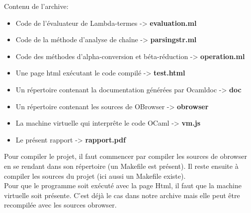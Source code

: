\documentclass[a4paper,11pt,titlepage]{article}
\begin{document}
  Contenu de l'archive:
\begin{itemize}
 \item Code de l'évaluateur de Lambda-termes  -> \textbf{evaluation.ml}
 \item Code de la méthode d'analyse de chaîne -> \textbf{parsingstr.ml}
 \item Code des méthodes d'alpha-conversion et béta-réduction -> \textbf{operation.ml}
 \item Une page html exécutant le code compilé -> \textbf{test.html}
 \item Un répertoire contenant la documentation générées par Ocamldoc -> \textbf{doc}
 \item Un répertoire contenant les sources de OBrowser -> \textbf{obrowser}
 \item La machine virtuelle qui interprête le code OCaml -> \textbf{vm.js}
 \item Le présent rapport -> \textbf{rapport.pdf}\\
\end{itemize}

  Pour compiler le projet, il faut commencer par compiler les sources de obrowser en se rendant dans son répertoire (un Makefile est présent). Il reste ensuite à compiler les sources du projet (ici aussi un Makefile existe).\\

  Pour que le programme soit exécuté avec la page Html, il faut que la machine virtuelle soit présente. C'est déjà le cas dans notre archive mais elle peut être recompilée avec les sources obrowser.
\end{document}

